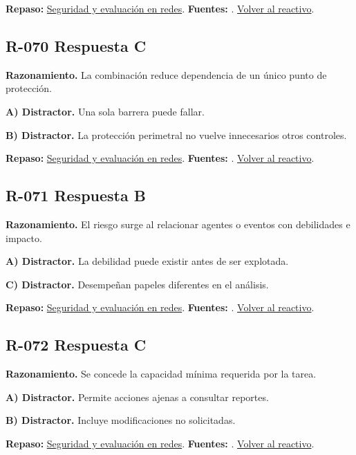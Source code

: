 \textbf{Repaso:} \hyperref[sec:r3]{Seguridad y evaluación en redes}. \textbf{Fuentes:} \cite{nistsecurity,owasp,aes,tls}. \hyperref[q:R-069]{Volver al reactivo}.\par\medskip

\subsection*{R-070 \quad Respuesta C}\label{s:R-070}
\textbf{Razonamiento.} La combinación reduce dependencia de un único punto de protección.

\textbf{A) Distractor. }Una sola barrera puede fallar.

\textbf{B) Distractor. }La protección perimetral no vuelve innecesarios otros controles.

\textbf{Repaso:} \hyperref[sec:r3]{Seguridad y evaluación en redes}. \textbf{Fuentes:} \cite{nistsecurity,owasp,aes,tls}. \hyperref[q:R-070]{Volver al reactivo}.\par\medskip

\subsection*{R-071 \quad Respuesta B}\label{s:R-071}
\textbf{Razonamiento.} El riesgo surge al relacionar agentes o eventos con debilidades e impacto.

\textbf{A) Distractor. }La debilidad puede existir antes de ser explotada.

\textbf{C) Distractor. }Desempeñan papeles diferentes en el análisis.

\textbf{Repaso:} \hyperref[sec:r3]{Seguridad y evaluación en redes}. \textbf{Fuentes:} \cite{nistsecurity,owasp,aes,tls}. \hyperref[q:R-071]{Volver al reactivo}.\par\medskip

\subsection*{R-072 \quad Respuesta C}\label{s:R-072}
\textbf{Razonamiento.} Se concede la capacidad mínima requerida por la tarea.

\textbf{A) Distractor. }Permite acciones ajenas a consultar reportes.

\textbf{B) Distractor. }Incluye modificaciones no solicitadas.

\textbf{Repaso:} \hyperref[sec:r3]{Seguridad y evaluación en redes}. \textbf{Fuentes:} \cite{nistsecurity,owasp,aes,tls}. \hyperref[q:R-072]{Volver al reactivo}.\par\medskip

